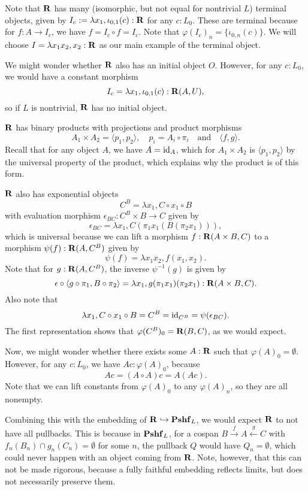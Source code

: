 Note that $ \mathbf{R} $ has many (isomorphic, but not equal for nontrivial $ L $) terminal objects, given by $ I_c := \lambda x_1, \iota_{0, 1}(c) : \mathbf{R} $ for any $ c: L_0 $. These are terminal because for $ f: A \to I_c $, we have $ f = I_c \circ f = I_c $. Note that $ \varphi(I_c)_n = \{ \iota_{0, n}(c) \} $. We will choose $ I = \lambda x_1 x_2, x_2 : \mathbf{R} $ as our main example of the terminal object.

We might wonder whether $ \mathbf{R} $ also has an initial object $ O $. However, for any $ c: L_0 $, we would have a constant morphism
\[ I_c = \lambda x_1, \iota_{0, 1}(c) : \mathbf{R}(A, U), \]
so if $ L $ is nontrivial, $ \mathbf{R} $ has no initial object.

$ \mathbf{R} $ has binary products with projections and product morphisms
\[ A_1 \times A_2 = \langle p_1, p_2 \rangle, \quad p_i = A_i \circ \pi_i \quad \text{and} \quad \langle f, g \rangle. \]
Recall that for any object $ A $, we have $ A = \text{id}_{A} $, which for $ A_1 \times A_2 $ is $ \langle p_1, p_2 \rangle $ by the universal property of the product, which explains why the product is of this form.

$ \mathbf{R} $ also has exponential objects
\[ C^B = \lambda x_1, C \circ x_1 \circ B \]
with evaluation morphism $ \epsilon_{BC}: C^B \times B \to C $ given by
\[ \epsilon_{BC} = \lambda x_1, C(\pi_1 x_1 (B (\pi_2 x_1))), \]
which is universal because we can lift a morphism $ f: \mathbf{R}(A \times B, C) $ to a morphism $ \psi(f): \mathbf{R}(A, C^B) $ given by
\[ \psi(f) = \lambda x_1 x_2, f (x_1, x_2). \]
Note that for $ g: \mathbf{R}(A, C^B) $, the inverse $ \psi^{-1}(g) $ is given by
\[ \epsilon \circ \langle g \circ \pi_1, B \circ \pi_2 \rangle = \lambda x_1, g (\pi_1 x_1) (\pi_2 x_1): \mathbf{R}(A \times B, C). \]
Also note that
\[ \lambda x_1, C \circ x_1 \circ B = C^B = \text{id}_{C^B} = \psi(\epsilon_{BC}). \]
The first representation shows that $ \varphi(C^B)_0 = \mathbf{R}(B, C) $, as we would expect.

Now, we might wonder whether there exists some $ A: \mathbf{R} $ such that $ \varphi(A)_0 = \emptyset $. However, for any $ c : L_0 $, we have $ A c : \varphi(A)_0 $, because
\[ A c = (A \circ A) c = A (A c). \]
Note that we can lift constants from $ \varphi(A)_0 $ to any $ \varphi(A)_n $, so they are all nonempty.

Combining this with the embedding of $ \mathbf{R} \hookrightarrow \mathbf{Pshf}_{L} $, we would expect $ \mathbf{R} $ to not have all pullbacks. This is because in $ \mathbf{Pshf}_{L} $, for a cospan $ B \xrightarrow f A \xleftarrow g C $ with $ f_n(B_n) \cap g_n(C_n) = \emptyset $ for some $ n $, the pullback $ Q $ would have $ Q_n = \emptyset $, which could never happen with an object coming from $ \mathbf{R} $. Note, however, that this can not be made rigorous, because a fully faithful embedding reflects limits, but does not necessarily preserve them.

